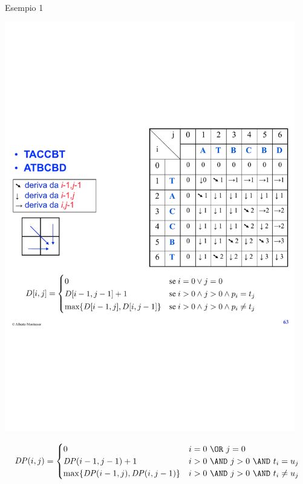 \begin{frame}{Esempio 1}

\centering
\vspace{-9pt}
\includegraphics[width=0.95\textwidth,page=1]{lcs.pdf}

\tiny
\[
  \mathit{DP}(i,j) = \begin{cases}
   0 & i=0\ \OR\ j=0 \\
   \mathit{DP}(i-1,j-1)+1 & i>0\ \AND\ j>0\ \AND\ t_i = u_j \\
   \max \{ \mathit{DP}(i-1,j), \mathit{DP}(i,j-1) \} & i>0\ \AND\ j>0\ \AND\ t_i \neq u_j
  \end{cases}
\]

\end{frame}

